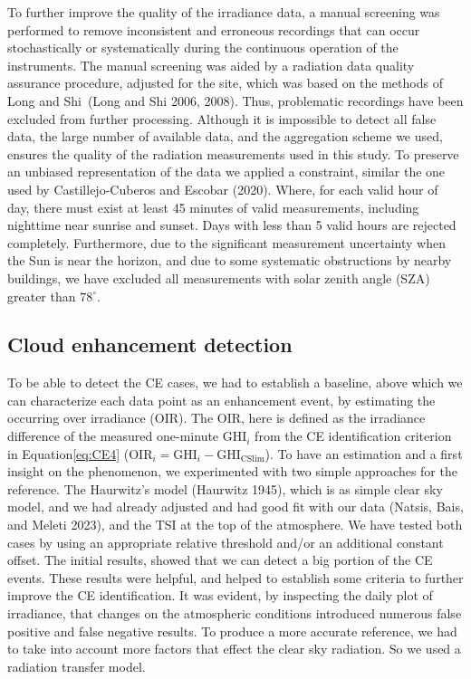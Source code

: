 \documentclass[
]{article}
\begin{document}
To further improve the quality of the irradiance data, a manual screening was
performed to remove inconsistent and erroneous recordings that can occur
stochastically or systematically during the continuous operation of the instruments.
The manual screening was aided by a radiation data quality assurance procedure,
adjusted for the site, which was based on the methods of Long and Shi~(Long and Shi 2006, 2008). Thus, problematic recordings have been excluded from further
processing. Although it is impossible to detect all false data, the large number of
available data, and the aggregation scheme we used, ensures the quality of the
radiation measurements used in this study.
To preserve an unbiased representation of the data we applied a constraint, similar
the one used by Castillejo-Cuberos and Escobar (2020). Where, for each valid hour of day, there must
exist at least 45 minutes of valid measurements, including nighttime near sunrise and
sunset. Days with less than 5 valid hours are rejected completely.
Furthermore, due to the significant measurement uncertainty when the Sun is near the
horizon, and due to some systematic obstructions by nearby buildings, we have
excluded all measurements with solar zenith angle (SZA) greater than
\(78^\circ\).

\hypertarget{cloud-enhancement-detection}{%
\subsection{Cloud enhancement detection}\label{cloud-enhancement-detection}}

To be able to detect the CE cases, we had to establish a baseline, above which we can
characterize each data point as an enhancement event, by estimating the occurring
over irradiance (OIR). The OIR, here is defined as the irradiance difference of the
measured one-minute \(\text{GHI}_i\) from the CE identification criterion in
Equation\nobreakspace\ref{eq:CE4}
(\(\text{OIR}_i = \text{GHI}_i - \text{GHI}_\text{CSlim}\)).
To have an estimation and a first insight on the phenomenon, we experimented with two
simple approaches for the reference. The Haurwitz's model (Haurwitz 1945), which is
as simple clear sky model, and we had already adjusted and had good fit with our data
(Natsis, Bais, and Meleti 2023), and the TSI at the top of the atmosphere. We have tested both cases
by using an appropriate relative threshold and/or an additional constant offset. The
initial results, showed that we can detect a big portion of the CE events. These
results were helpful, and helped to establish some criteria to further improve the CE
identification. It was evident, by inspecting the daily plot of irradiance, that
changes on the atmospheric conditions introduced numerous false positive and false
negative results. To produce a more accurate reference, we had to take into account
more factors that effect the clear sky radiation. So we used a radiation transfer
model.
\end{document}
